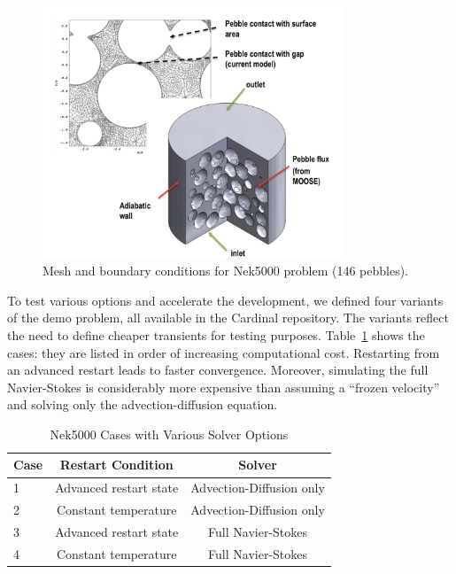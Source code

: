 \begin{figure}[!h]
\centering
\includegraphics[clip=true,width=0.8\textwidth]{Figures/pb_mesh}
\caption{Mesh and boundary conditions for Nek5000 problem (146 pebbles).}
\label{f:pb2}
\end{figure}

To test various options and accelerate the development, we defined four
variants of the demo problem, all available in the Cardinal repository. The
variants reflect the need to define cheaper transients for testing purposes.
Table~\ref{tab:nek} shows the cases: they are listed in order of increasing
computational cost. Restarting from an advanced restart leads to faster
convergence. Moreover, simulating the full Navier-Stokes is considerably more
expensive than assuming a ``frozen velocity'' and solving only the
advection-diffusion equation.

\begin{table}
  \centering
  \begin{tabular}{|lcc|}
    \hline \hline
    Case & Restart Condition & Solver \\
    \hline
    1 & Advanced restart state & Advection-Diffusion only \\
    2 & Constant temperature   & Advection-Diffusion only \\
    3 & Advanced restart state & Full Navier-Stokes \\
    4 & Constant temperature   & Full Navier-Stokes \\
    \hline \hline
  \end{tabular}
  \caption{Nek5000 Cases with Various Solver Options}
  \label{tab:nek}
\end{table}

